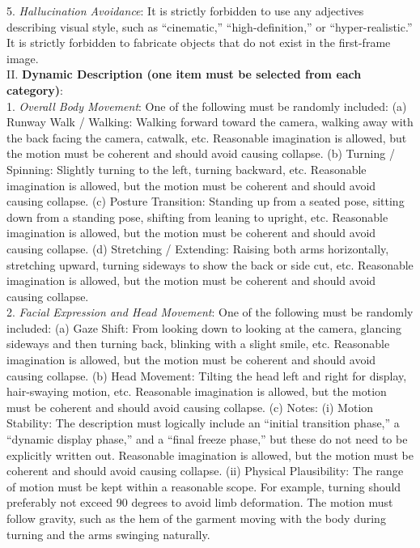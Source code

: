 \begin{tcolorbox}[
    colback=gray!10,
    colframe=gray!30,
    boxrule=0.3pt,
    arc=1.5pt,
    left=6pt,
    right=6pt,
    top=6pt,
    bottom=6pt
]
    5. \textit{Hallucination Avoidance}: It is strictly forbidden to use any adjectives describing visual style, such as ``cinematic,'' ``high-definition,'' or ``hyper-realistic.'' It is strictly forbidden to fabricate objects that do not exist in the first-frame image.
\\
II. \textbf{Dynamic Description (one item must be selected from each category)}:
\\
    1. \textit{Overall Body Movement}: One of the following must be randomly included:
        (a) Runway Walk / Walking: Walking forward toward the camera, walking away with the back facing the camera, catwalk, etc. Reasonable imagination is allowed, but the motion must be coherent and should avoid causing collapse.
        (b) Turning / Spinning: Slightly turning to the left, turning backward, etc. Reasonable imagination is allowed, but the motion must be coherent and should avoid causing collapse.
        (c) Posture Transition: Standing up from a seated pose, sitting down from a standing pose, shifting from leaning to upright, etc. Reasonable imagination is allowed, but the motion must be coherent and should avoid causing collapse.
        (d) Stretching / Extending: Raising both arms horizontally, stretching upward, turning sideways to show the back or side cut, etc. Reasonable imagination is allowed, but the motion must be coherent and should avoid causing collapse.
\\
    2. \textit{Facial Expression and Head Movement}: One of the following must be randomly included:
        (a) Gaze Shift: From looking down to looking at the camera, glancing sideways and then turning back, blinking with a slight smile, etc. Reasonable imagination is allowed, but the motion must be coherent and should avoid causing collapse.
        (b) Head Movement: Tilting the head left and right for display, hair-swaying motion, etc. Reasonable imagination is allowed, but the motion must be coherent and should avoid causing collapse.
        (c) Notes:
            (i) Motion Stability: The description must logically include an “initial transition phase,” a “dynamic display phase,” and a “final freeze phase,” but these do not need to be explicitly written out. Reasonable imagination is allowed, but the motion must be coherent and should avoid causing collapse.
            (ii) Physical Plausibility: The range of motion must be kept within a reasonable scope. For example, turning should preferably not exceed 90 degrees to avoid limb deformation. The motion must follow gravity, such as the hem of the garment moving with the body during turning and the arms swinging naturally.

\end{tcolorbox}
